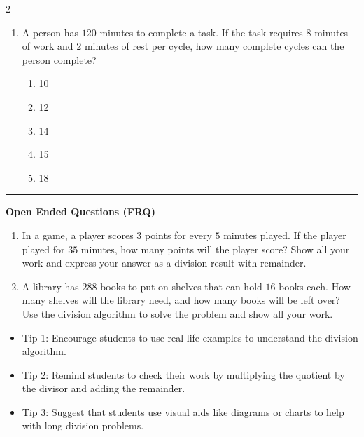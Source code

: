 \documentclass[10pt]{article}
\begin{document}
\begin{multicols}{2}
\begin{enumerate}[label=\textbf{Q\arabic*.}, leftmargin=*, itemsep=6pt, parsep=0pt]
  \item \small A person has $120$ minutes to complete a task. If the task requires $8$ minutes of work and $2$ minutes of rest per cycle, how many complete cycles can the person complete?
  \begin{enumerate}[label=(\Alph*), leftmargin=0.6cm, nosep, itemsep=2pt]
    \item 10
    \item 12
    \item 14
    \item 15
    \item 18
  \end{enumerate}

\end{enumerate}
\end{multicols}

\vspace{-0.2cm}
\hrule
\vspace{0.2cm}
\textbf{\small Open Ended Questions (FRQ)}
\begin{enumerate}[label=\textbf{Q\arabic*.}, start=9, itemsep=5pt, topsep=0pt]

  \item \small In a game, a player scores $3$ points for every $5$ minutes played. If the player played for $35$ minutes, how many points will the player score? Show all your work and express your answer as a division result with remainder. \vspace{2cm}

  \item \small A library has $288$ books to put on shelves that can hold $16$ books each. How many shelves will the library need, and how many books will be left over? Use the division algorithm to solve the problem and show all your work. \vspace{2cm}

\end{enumerate}

\vfill

\begin{tcolorbox}[colback=blue!5, colframe=mainblue!50, title=\small \textbf{Chef's Tips}, fonttitle=\bfseries, bottom=1mm]
\begin{itemize}[noitemsep, topsep=2pt, leftmargin=0.5cm]
  \item \scriptsize Tip 1: Encourage students to use real-life examples to understand the division algorithm.\item \scriptsize Tip 2: Remind students to check their work by multiplying the quotient by the divisor and adding the remainder.\item \scriptsize Tip 3: Suggest that students use visual aids like diagrams or charts to help with long division problems.
\end{itemize}
\end{tcolorbox}
\end{document}
